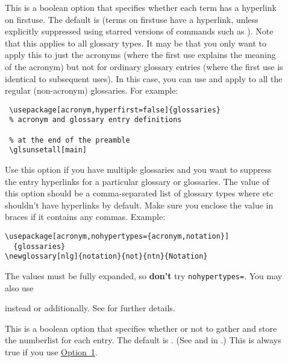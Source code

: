 \documentclass[report,inlinetitle]{nlctdoc}
\newcommand*{\opt}[1]{\hyperlink{option#1}{Option~#1}}
\newcommand*{\firstuse}{\gls{firstuse}}
\begin{document}
\begin{description}
\item[] This is a boolean option that specifies
whether each term has a hyperlink on \firstuse. The default is 
 (terms on \gls{firstuse} have a hyperlink, 
unless explicitly suppressed using starred versions of commands
such as ). Note that this applies to all glossary types.
It may be that you only want to apply this to just the acronyms
(where the first use explains the meaning of the acronym) but not
for ordinary glossary entries (where the first use is identical to
subsequent uses). In this case, you can use  and
apply  to all the regular (non-acronym) glossaries.
For example:
\begin{verbatim}
 \usepackage[acronym,hyperfirst=false]{glossaries}
 % acronym and glossary entry definitions

 % at the end of the preamble
 \glsunsetall[main]
\end{verbatim}

\item[] Use this option if you have multiple
glossaries and you want to suppress the entry hyperlinks for a
particular glossary or glossaries. The value of this option should
be a comma-separated list of glossary types where  etc
shouldn't have hyperlinks by default. Make sure you enclose the
value in braces if it contains any commas. Example:
\begin{verbatim}
\usepackage[acronym,nohypertypes={acronym,notation}]
  {glossaries}
\newglossary[nlg]{notation}{not}{ntn}{Notation}
\end{verbatim}
The values must be fully expanded, so \textbf{don't} try
\texttt{nohypertypes\discretionary{}{}{}=}. You may also use
\begin{definition}
\end{definition}
instead or additionally.
See  for further details.

\item[] This is a boolean option that
specifies whether or not to gather and store the \gls{numberlist}
for each entry. The default is . (See
 and  in
.) This is always true if you
use \opt1.

\end{description}
\end{document}

